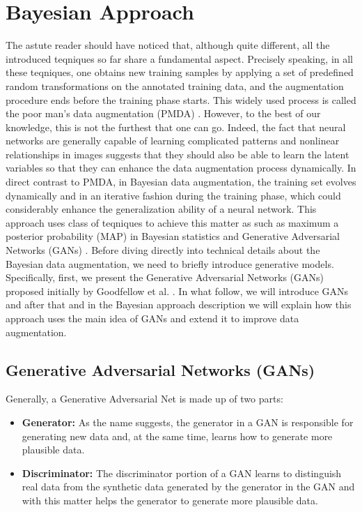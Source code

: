 \section{Bayesian Approach}
\label{tit:bayesian-approach}
The astute reader should have noticed that, although quite different, all the introduced teqniques so far share a fundamental aspect. Precisely speaking, in all these teqniques, one obtains new training samples by applying a set of predefined random transformations on the annotated training data, and the augmentation procedure ends before the training phase starts. This widely used process is called the poor man's data augmentation (PMDA) \cite{poor_man_data_augmentation}. However, to the best of our knowledge, this is not the furthest that one can go. Indeed, the fact that neural networks are generally capable of learning complicated patterns and nonlinear relationships in images suggests that they should also be able to learn the latent variables so that they can enhance the data augmentation process dynamically.
In direct contrast to PMDA, in Bayesian data augmentation, the training set evolves dynamically and
in an iterative fashion during the training phase, which could considerably enhance the
generalization ability of a neural network. This approach uses class of teqniques to achieve this
matter as such as maximum a posterior probability (MAP) \cite{MAP_Bayesian} in Bayesian statistics and Generative
Adversarial Networks (GANs) . Before diving directly into technical details about the
Bayesian data augmentation, we need to briefly introduce generative models. Specifically, first, we
present the Generative Adversarial Networks (GANs) proposed initially by Goodfellow et al.
\cite{goodflew_bayesian_approach}. In what follow, we
will introduce GANs and after that and in the Bayesian approach description we will explain how this
approach uses the main idea of GANs and extend it to improve data augmentation.

\subsection{Generative Adversarial Networks (GANs)}
\label{tit:Generative-Adversarial-Network}
Generally, a Generative Adversarial Net is made up of two parts:
\begin{itemize}
  \item{\textbf{Generator:}} As the name suggests, the generator in a GAN is responsible for generating new data and, at the same time, learns how to generate more plausible data.
  \item{\textbf{Discriminator:}} The discriminator portion of a GAN learns to distinguish real data from the synthetic data generated
        by the generator in the GAN and with this matter helps the generator to generate more plausible data.
\end{itemize}

